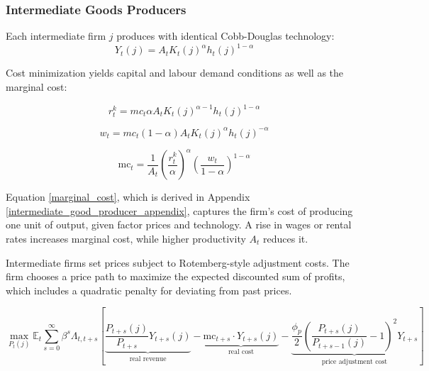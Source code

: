 \documentclass[11pt,preprint]{elsarticle}
\numberwithin{equation}{section}
\numberwithin{figure}{section}
\numberwithin{table}{section}
\begin{document}
\subsubsection{Intermediate Goods
Producers}\label{intermediate-goods-producers}

Each intermediate firm \(j\) produces with identical Cobb-Douglas
technology:\\
\begin{equation}
Y_t(j) = A_t K_t(j)^{\alpha} h_t(j)^{1-\alpha}
\label{intermediate_production}
\end{equation}

Cost minimization yields capital and labour demand conditions as well as
the marginal cost:

\begin{equation}
r_t^k =m c_t \alpha A_t K_t(j)^{\alpha-1} h_t(j)^{1-\alpha}
\label{Capital_Demand_Condition}
\end{equation}

\begin{equation}
w_t = mc_t (1-\alpha) A_t K_t(j)^{\alpha} h_t(j)^{-\alpha}
\label{Labour_Demand_Condition}
\end{equation}

\begin{equation}
\text{mc}_t = \frac{1}{A_t} \left( \frac{r_t^k}{\alpha} \right)^{\alpha} \left( \frac{w_t}{1-\alpha} \right)^{1-\alpha}
\label{marginal_cost}
\end{equation}

Equation \eqref{marginal_cost}, which is derived in Appendix
\ref{intermediate_good_producer_appendix}, captures the firm's cost of
producing one unit of output, given factor prices and technology. A rise
in wages or rental rates increases marginal cost, while higher
productivity \(A_t\) reduces it.

Intermediate firms set prices subject to Rotemberg-style adjustment
costs. The firm chooses a price path to maximize the expected discounted
sum of profits, which includes a quadratic penalty for deviating from
past prices.

\begin{equation}
\max_{P_t(j)} \mathbb{E}_t \sum_{s=0}^{\infty} \beta^s \Lambda_{t,t+s} \left[
\underbrace{\frac{P_{t+s}(j)}{P_{t+s}} Y_{t+s}(j)}_{\text{real revenue}} 
- \underbrace{\text{mc}_{t+s} \cdot Y_{t+s}(j)}_{\text{real cost}} 
- \underbrace{\frac{\phi_p}{2} \left( \frac{P_{t+s}(j)}{P_{t+s-1}(j)} - 1 \right)^2 Y_{t+s}}_{\text{price adjustment cost}}
\right]
\label{intermediate_objective}
\end{equation}
\end{document}
